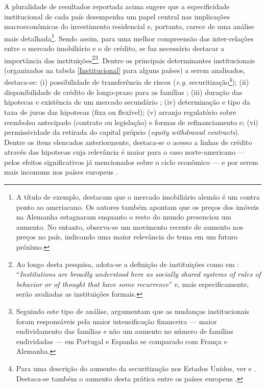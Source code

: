 A pluralidade de resultados reportada acima sugere que a especificidade institucional de cada país desempenha um papel central nas implicações macroeconômicas do investimento residencial e, portanto, carece de uma análise mais detalhada\footnote{A título de exemplo, \textcite{wijburg_alternative_2017} destacam que o mercado imobiliário alemão  é um contra ponto ao ameriacano. Os autores também apontam que os preços dos imóveis na Alemanha estagnaram enquanto o resto do mundo presenciou um aumento. No entanto, observa-se um movimento recente de aumento nos preços no país, indicando uma maior relevância do tema em um futuro próximo.}. 
Sendo assim, para uma melhor compreensão das inter-relações entre o mercado imobiliário e o de crédito, se faz necessário destacar a importância das instituições\footnote{
	Ao longo desta pesquisa, adota-se a definição de instituições como em 	\textcite[p.~85]{dequech_economic_2013}: ``\textit{Institutions are broadly understood here as socially shared systems of rules of behavior or of thought that have some recurrence}'' e, mais especificamente, serão avaliadas as instituições formais.}\footnote{Seguindo este tipo de análise, \textcite{van_gunten_varieties_2018} argumentam que as mudanças institucionais foram responsáveis pela maior intensificação financeira --- maior endividamento das famílias e não um aumento no número de famílias endividadas --- em Portugal e Espanha se comparado com França e Alemanha.}.  
Dentre os principais determinantes institucionais (organizados na tabela \ref{Institucional} para alguns países) a serem analisados, destaca-se: (i) possibilidade de transferência de riscos (\textit{e.g.} securitização\footnote{Para uma descrição do aumento da securitização nos Estados Unidos, ver \textcite{green_american_2005} e \textcite{cagnin_o_2009}. Destaca-se também o aumento desta prática entre os países europeus \cite{european_central_bank_housing_2010}.}); (ii) disponibilidade de crédito de longo-prazo para as famílias \cite{schwartz_politics_2009}; (iii) duração das hipotecas e existência de um mercado secundário \cite{green_american_2005}; (iv) determinação  e tipo da taxa de juros das hipotecas (fixa ou flexível); (v) arranjo regulatório sobre reembolso antecipado (contrato ou legislação) e formas de refinanciamento e; (vi) permissividade da retirada do capital próprio (\textit{equity withdrawal contracts}). Dentre os itens elencados anteriormente, destaca-se o acesso a linhas de crédito através das hipotecas cuja relevância é maior para o caso norte-americano --- pelos efeitos significativos já mencionados sobre o ciclo econômico --- e por serem mais incomuns nos países europeus \cite[p.~95]{van_gunten_varieties_2018}.

